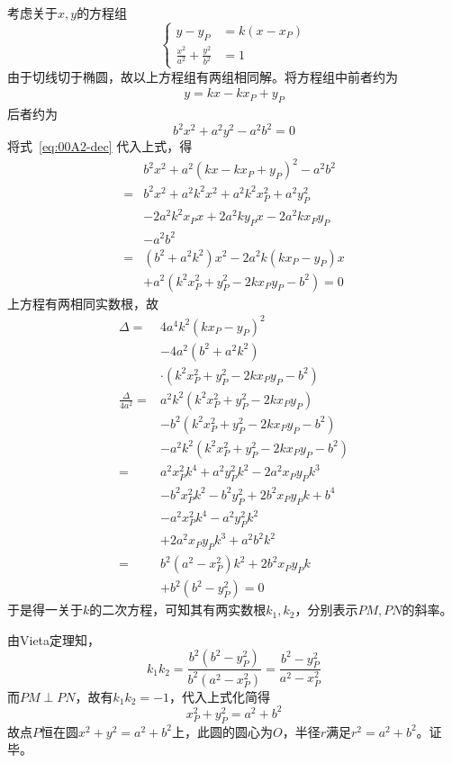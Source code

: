 考虑关于$x, y$的方程组
\[ \left\{ \begin{aligned}
  y - y_P &= k(x - x_P) \\
  \frac{x^2}{a^2} + \frac{y^2}{b^2} &= 1
\end{aligned} \right. \]
由于切线切于椭圆，故以上方程组有两组相同解。将方程组中前者约为
\begin{align}
  y = kx - kx_P + y_P \label{eq:00A2-dec}
\end{align}
后者约为
\[ b^2x^2 + a^2y^2 - a^2b^2 = 0 \]
将式~\ref{eq:00A2-dec} 代入上式，得
\begin{align*}
  & b^2x^2 + a^2(kx - kx_P + y_P)^2 - a^2b^2 \\
  ={}& b^2x^2 + a^2k^2x^2 + a^2k^2x_P^2 + a^2y_P^2 \\
  & - 2a^2k^2x_Px + 2a^2ky_Px - 2a^2kx_Py_P \\
  & -a^2b^2 \\
  ={}& \left(b^2 + a^2k^2\right)x^2 - 2a^2k(kx_P - y_P)x \\
  & + a^2\left(k^2x_P^2 + y_P^2 - 2kx_Py_P - b^2\right) = 0
\end{align*}
上方程有两相同实数根，故
\begin{align*}
  \Delta ={}& 4a^4k^2\left(kx_P - y_P\right)^2 \\
  & - 4a^2\left(b^2 + a^2k^2\right) \\
  & \cdot \left(k^2x_P^2 + y_P^2 - 2kx_Py_P - b^2\right) \\
  \frac{\Delta}{4a^2}={}& a^2k^2\left(k^2x_P^2 + y_P^2 - 2kx_Py_P\right) \\
  & - b^2\left(k^2x_P^2 + y_P^2 - 2kx_Py_P - b^2\right) \\
  & - a^2k^2\left(k^2x_P^2 + y_P^2 - 2kx_Py_P - b^2\right) \\
  ={}& a^2x_P^2k^4 + a^2y_P^2k^2 - 2a^2x_Py_Pk^3 \\
  & - b^2x_P^2k^2 - b^2y_P^2 + 2b^2x_Py_Pk + b^4 \\
  & - a^2x_P^2k^4 - a^2y_P^2k^2 \\
  & + 2a^2x_Py_Pk^3 + a^2b^2k^2 \\
  ={}& b^2\left(a^2 - x_P^2\right)k^2 + 2b^2x_Py_Pk \\
  & + b^2\left(b^2 - y_P^2\right) = 0
\end{align*}
于是得一关于$k$的二次方程，可知其有两实数根$k_1, k_2$，分别表示$PM, PN$的斜率。

由Vieta定理知，
\[ k_1k_2 = \frac{b^2\left(b^2 - y_P^2\right)}{b^2\left(a^2 - x_P^2\right)} = \frac{b^2 - y_P^2}{a^2 - x_P^2} \]
而$PM \perp PN$，故有$k_1k_2 = -1$，代入上式化简得
\[ x_P^2 + y_P^2 = a^2 + b^2 \]
故点$P$恒在圆$x^2 + y^2 = a^2 + b^2$上，此圆的圆心为$O$，半径$r$满足$r^2 = a^2 + b^2$。证毕。
